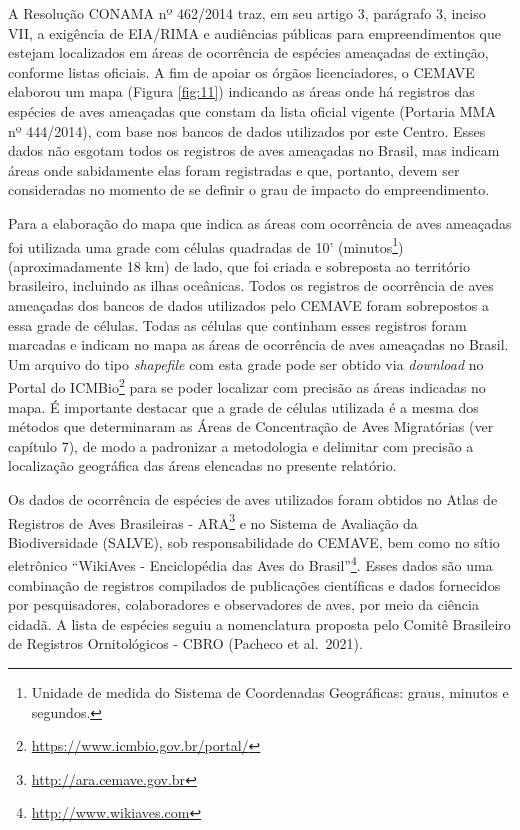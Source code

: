 \documentclass[
  oneside]{scrbook}
\DeclareRobustCommand{\href}[2]{#2\footnote{\url{#1}}}
\begin{document}
A Resolução CONAMA nº 462/2014 traz, em seu artigo 3, parágrafo 3, inciso VII, a exigência de EIA/RIMA e audiências públicas para empreendimentos que estejam localizados em áreas de ocorrência de espécies ameaçadas de extinção, conforme listas oficiais. A fim de apoiar os órgãos licenciadores, o CEMAVE elaborou um mapa (Figura \ref{fig:11}) indicando as áreas onde há registros das espécies de aves ameaçadas que constam da lista oficial vigente (Portaria MMA nº 444/2014), com base nos bancos de dados utilizados por este Centro. Esses dados não esgotam todos os registros de aves ameaçadas no Brasil, mas indicam áreas onde sabidamente elas foram registradas e que, portanto, devem ser consideradas no momento de se definir o grau de impacto do empreendimento.

Para a elaboração do mapa que indica as áreas com ocorrência de aves ameaçadas foi utilizada uma grade com células quadradas de 10' (minutos\footnote{Unidade de medida do Sistema de Coordenadas Geográficas: graus, minutos e segundos.}) (aproximadamente 18 km) de lado, que foi criada e sobreposta ao território brasileiro, incluindo as ilhas oceânicas. Todos os registros de ocorrência de aves ameaçadas dos bancos de dados utilizados pelo CEMAVE foram sobrepostos a essa grade de células. Todas as células que continham esses registros foram marcadas e indicam no mapa as áreas de ocorrência de aves ameaçadas no Brasil. Um arquivo do tipo \emph{shapefile} com esta grade pode ser obtido via \emph{download} no \href{https://www.icmbio.gov.br/portal/}{Portal do ICMBio} para se poder localizar com precisão as áreas indicadas no mapa. É importante destacar que a grade de células utilizada é a mesma dos métodos que determinaram as Áreas de Concentração de Aves Migratórias (ver capítulo 7), de modo a padronizar a metodologia e delimitar com precisão a localização geográfica das áreas elencadas no presente relatório.

Os dados de ocorrência de espécies de aves utilizados foram obtidos no \href{http://ara.cemave.gov.br}{Atlas de Registros de Aves Brasileiras - ARA} e no Sistema de Avaliação da Biodiversidade (SALVE), sob responsabilidade do CEMAVE, bem como no sítio eletrônico \href{http://www.wikiaves.com}{``WikiAves - Enciclopédia das Aves do Brasil''}. Esses dados são uma combinação de registros compilados de publicações científicas e dados fornecidos por pesquisadores, colaboradores e observadores de aves, por meio da ciência cidadã. A lista de espécies seguiu a nomenclatura proposta pelo Comitê Brasileiro de Registros Ornitológicos - CBRO (Pacheco et al.~2021).
\end{document}
